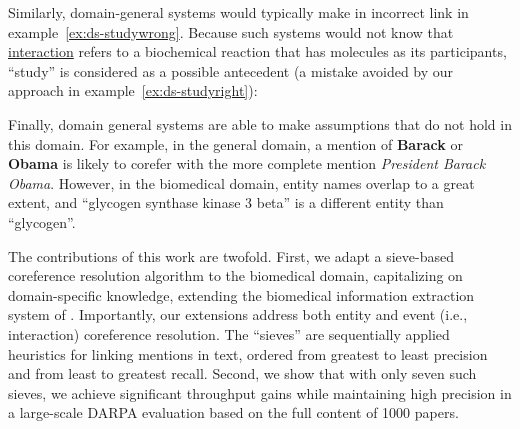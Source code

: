 \begin{exe}
	\ex \begin{xlist}
		\label{ex:ds-selfbindingwrong}
		\label{ex:ds-selfbindingright}
	\end{xlist}
\end{exe}

Similarly, domain-general systems would typically make in incorrect link in example~\ref{ex:ds-studywrong}. Because such systems would not know that \underline{interaction} refers to a biochemical reaction that has molecules as its participants, ``study'' is considered as a possible antecedent (a mistake avoided by our approach in example~\ref{ex:ds-studyright}):

\begin{exe}
	\ex \begin{xlist}
		\label{ex:ds-studywrong}
		\label{ex:ds-studyright}
	\end{xlist}
\end{exe}

Finally, domain general systems are able to make assumptions that do not hold in this domain. For example, in the general domain, a mention of {\bf Barack} or {\bf Obama} is likely to corefer with the more complete mention {\it President Barack Obama}. However, in the biomedical domain, entity names overlap to a great extent, and ``glycogen synthase kinase 3 beta'' is a different entity than ``glycogen''.

The contributions of this work are twofold.
First, we adapt a sieve-based coreference resolution algorithm \cite{lee2013sieve,lee2011sieve} to the biomedical domain, capitalizing on domain-specific knowledge, extending the biomedical information extraction system of . Importantly, our extensions address both entity and event (i.e., interaction) coreference resolution. 
The ``sieves'' are sequentially applied heuristics for linking mentions in text, ordered from greatest to least precision and from least to greatest recall. 
Second, we show that with only seven such sieves, we achieve significant throughput gains while maintaining high precision in a large-scale DARPA evaluation based on the full content of 1000 papers.




